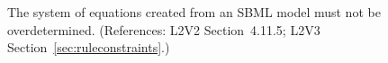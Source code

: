The system of equations created from an SBML model must not be
overdetermined.  (References: L2V2 Section~4.11.5; L2V3
Section~\ref{sec:ruleconstraints}.)
